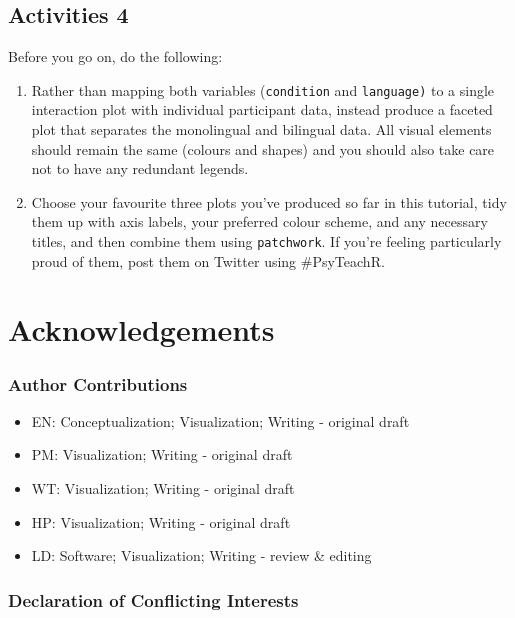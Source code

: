 \documentclass[
  english,
  doc,floatsintext]{apa6}
\providecommand{\tightlist}{%
  \setlength{\itemsep}{0pt}\setlength{\parskip}{0pt}}
\begin{document}
\hypertarget{activities-4}{%
\subsection{Activities 4}\label{activities-4}}

Before you go on, do the following:

\begin{enumerate}
\def\labelenumi{\arabic{enumi}.}
\item
  Rather than mapping both variables (\texttt{condition} and \texttt{language)} to a single interaction plot with individual participant data, instead produce a faceted plot that separates the monolingual and bilingual data. All visual elements should remain the same (colours and shapes) and you should also take care not to have any redundant legends.
\item
  Choose your favourite three plots you've produced so far in this tutorial, tidy them up with axis labels, your preferred colour scheme, and any necessary titles, and then combine them using \texttt{patchwork}. If you're feeling particularly proud of them, post them on Twitter using \#PsyTeachR.
\end{enumerate}

\hypertarget{acknowledgements}{%
\section{Acknowledgements}\label{acknowledgements}}

\hypertarget{author-contributions}{%
\subsubsection{Author Contributions}\label{author-contributions}}

\begin{itemize}
\tightlist
\item
  EN: Conceptualization; Visualization; Writing - original draft
\item
  PM: Visualization; Writing - original draft
\item
  WT: Visualization; Writing - original draft
\item
  HP: Visualization; Writing - original draft
\item
  LD: Software; Visualization; Writing - review \& editing
\end{itemize}

\hypertarget{declaration-of-conflicting-interests}{%
\subsubsection{Declaration of Conflicting Interests}\label{declaration-of-conflicting-interests}}
\end{document}
